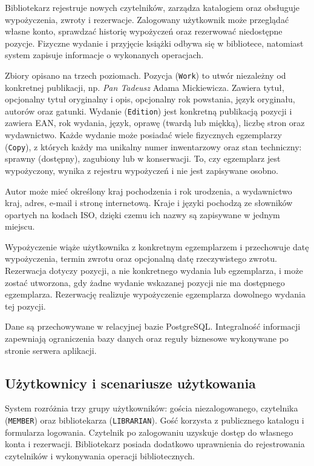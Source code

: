 \documentclass[11pt, a4paper]{article}
\begin{document}
Bibliotekarz rejestruje nowych czytelników, zarządza katalogiem oraz obsługuje wypożyczenia, zwroty i rezerwacje. Zalogowany użytkownik może przeglądać własne konto, sprawdzać historię wypożyczeń oraz rezerwować niedostępne pozycje. Fizyczne wydanie i przyjęcie książki odbywa się w bibliotece, natomiast system zapisuje informacje o wykonanych operacjach.

Zbiory opisano na trzech poziomach. Pozycja (\texttt{Work}) to utwór niezależny od konkretnej publikacji, np. \emph{Pan Tadeusz} Adama Mickiewicza. Zawiera tytuł, opcjonalny tytuł oryginalny i opis, opcjonalny rok powstania, język oryginału, autorów oraz gatunki. Wydanie (\texttt{Edition}) jest konkretną publikacją pozycji i zawiera EAN, rok wydania, język, oprawę (twardą lub miękką), liczbę stron oraz wydawnictwo. Każde wydanie może posiadać wiele fizycznych egzemplarzy (\texttt{Copy}), z których każdy ma unikalny numer inwentarzowy oraz stan techniczny: sprawny (dostępny), zagubiony lub w konserwacji. To, czy egzemplarz jest wypożyczony, wynika z rejestru wypożyczeń i nie jest zapisywane osobno.

Autor może mieć określony kraj pochodzenia i rok urodzenia, a wydawnictwo kraj, adres, e-mail i stronę internetową. Kraje i języki pochodzą ze słowników opartych na kodach ISO, dzięki czemu ich nazwy są zapisywane w jednym miejscu.

Wypożyczenie wiąże użytkownika z konkretnym egzemplarzem i przechowuje datę wypożyczenia, termin zwrotu oraz opcjonalną datę rzeczywistego zwrotu. Rezerwacja dotyczy pozycji, a nie konkretnego wydania lub egzemplarza, i może zostać utworzona, gdy żadne wydanie wskazanej pozycji nie ma dostępnego egzemplarza. Rezerwację realizuje wypożyczenie egzemplarza dowolnego wydania tej pozycji.

Dane są przechowywane w relacyjnej bazie PostgreSQL. Integralność informacji zapewniają ograniczenia bazy danych oraz reguły biznesowe wykonywane po stronie serwera aplikacji.

\subsection{Użytkownicy i scenariusze użytkowania}
\label{subsec:uzytkownicy-scenariusze}

System rozróżnia trzy grupy użytkowników: gościa niezalogowanego, czytelnika (\texttt{MEMBER}) oraz bibliotekarza (\texttt{LIBRARIAN}). Gość korzysta z publicznego katalogu i formularza logowania. Czytelnik po zalogowaniu uzyskuje dostęp do własnego konta i rezerwacji. Bibliotekarz posiada dodatkowo uprawnienia do rejestrowania czytelników i wykonywania operacji bibliotecznych.
\end{document}
